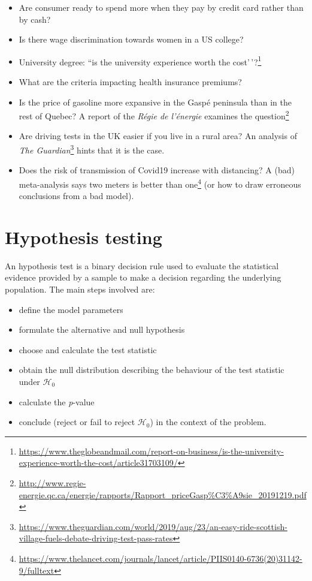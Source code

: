 \documentclass[
  11pt,
  letterpaper,
]{book}
\providecommand{\tightlist}{%
  \setlength{\itemsep}{0pt}\setlength{\parskip}{0pt}}
\renewcommand{\href}[2]{#2\footnote{\url{#1}}}
\theoremstyle{definition}
\theoremstyle{definition}
\theoremstyle{definition}
\theoremstyle{definition}
\theoremstyle{remark}
\begin{document}
\begin{itemize}
\tightlist
\item
  Are consumer ready to spend more when they pay by credit card rather than by cash?
\item
  Is there wage discrimination towards women in a US college?
\item
  University degree: \href{https://www.theglobeandmail.com/report-on-business/is-the-university-experience-worth-the-cost/article31703109/}{``is the university experience worth the cost'\,'?}
\item
  What are the criteria impacting health insurance premiums?
\item
  Is the price of gasoline more expansive in the Gaspé peninsula than in the rest of Quebec? \href{http://www.regie-energie.qc.ca/energie/rapports/Rapport_priceGasp\%C3\%A9sie_20191219.pdf}{A report of the \emph{Régie de l'énergie} examines the question}
\item
  Are driving tests in the UK easier if you live in a rural area? \href{https://www.theguardian.com/world/2019/aug/23/an-easy-ride-scottish-village-fuels-debate-driving-test-pass-rates}{An analysis of \emph{The Guardian}} hints that it is the case.
\item
  Does the risk of transmission of Covid19 increase with distancing? \href{https://www.thelancet.com/journals/lancet/article/PIIS0140-6736(20)31142-9/fulltext}{A (bad) meta-analysis says two meters is better than one} (or how to draw erroneous conclusions from a bad model).
\end{itemize}

\hypertarget{tests}{%
\section{Hypothesis testing}\label{tests}}

An hypothesis test is a binary decision rule used to evaluate the statistical evidence provided by a sample to make a decision regarding the underlying population. The main steps involved are:

\begin{itemize}
\tightlist
\item
  define the model parameters
\item
  formulate the alternative and null hypothesis
\item
  choose and calculate the test statistic
\item
  obtain the null distribution describing the behaviour of the test statistic under \(\mathscr{H}_0\)
\item
  calculate the \emph{p}-value
\item
  conclude (reject or fail to reject \(\mathscr{H}_0\)) in the context of the problem.
\end{itemize}
\end{document}
